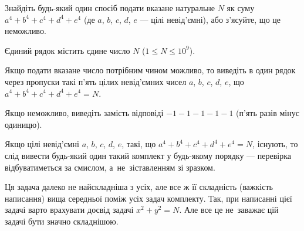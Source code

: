 ﻿Знайдіть будь-який один спосіб подати вказане натуральне $N$ як суму $a^4+b^4+c^4+d^4+e^4$ (де $a$, $b$, $c$, $d$, $e$ --- цілі невід'ємні), або з'ясуйте, що це неможливо.

\InputFile
Єдиний рядок містить єдине число $N$ ($1\leqslant N\leqslant 10^9$).

\OutputFile
Якщо подати вказане число потрібним чином можливо, то виведіть в один рядок через пропуски такі п'ять цілих невід'ємних чисел $a$, $b$, $c$, $d$, $e$, що $a^4+b^4+c^4+d^4+e^4=N$.

Якщо неможливо, виведіть замість відповіді $-1 -1 -1 -1 -1$ (п'ять разів мінус одиницю).

\Examples

\begin{example}     
\end{example}       

\Note

Якщо цілі невід'ємні $a$, $b$, $c$, $d$, $e$, такі, що $a^4+b^4+c^4+d^4+e^4=N$, існують, то слід вивести будь-який один такий комплект у будь-якому порядку --- перевірка відбуватиметься за смислом, а~не~зіставленням зі зразком.

Ця задача далеко не найскладніша з усіх, але все ж її складність (важкість написання) вища середньої поміж усіх задач комплекту. Так, при написанні цієї задачі варто врахувати досвід задачі $x^2+y^2=N$. Але все це не~заважає цій задачі бути значно складнішою.